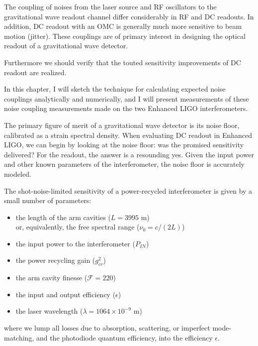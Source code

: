 \label{chapter5}

The coupling of noises from the laser source and RF oscillators to the
gravitational wave readout channel differ considerably in RF and DC
readouts.  In addition, DC readout with an OMC is generally much more
sensitive to beam motion (jitter).  These couplings are of primary
interest in designing the optical readout of a gravitational wave
detector.

Furthermore we should verify that the touted sensitivity improvements
of DC readout are realized.

In this chapter, I will sketch the technique for calculating expected
noise couplings analytically and numerically, and I will present
measurements of these noise coupling measurements made on the two
Enhanced LIGO interferometers.


The primary figure of merit of a gravitational wave detector is its
noise floor, calibrated as a strain spectral density.  When evaluating
DC readout in Enhanced LIGO, we can begin by looking at the noise
floor: was the promised sensitivity delivered?  For the readout, the
answer is a resounding yes.  Given the input power and other known
parameters of the interferometer, the noise floor is accurately
modeled.

The shot-noise-limited sensitivity of a power-recycled interferometer
is given by a small number of parameters:

\begin{itemize}
\item the length of the arm cavities ($L = 3995$ m)\\
or, equivalently, the free spectral range ($\nu_0 = c/(2L)$)
\item the input power to the interferometer ($P_{IN}$)
\item the power recycling gain ($g_{cr}^2$)
\item the arm cavity finesse ($\mathcal{F} = 220$)
\item the input and output efficiency ($\epsilon$)
\item the laser wavelength ($\lambda = 1064\times10^{-9}$ m)
\end{itemize}
where we lump all losses due to absorption, scattering, or imperfect
mode-matching, and the photodiode quantum efficiency, into the efficiency
$\epsilon$.

